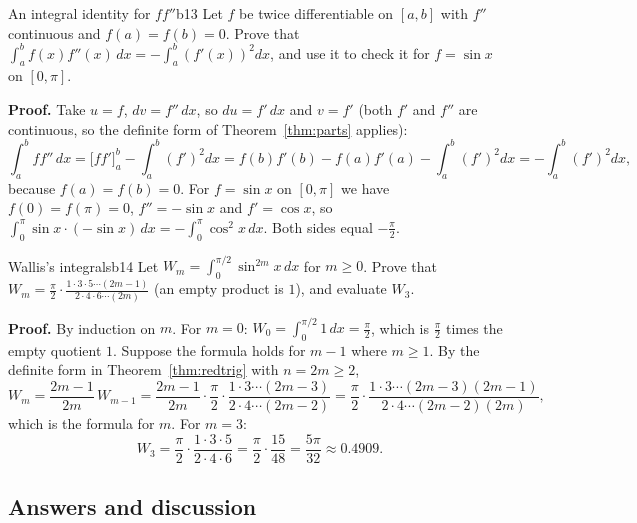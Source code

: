 \documentclass[11pt]{article}
\begin{document}
\begin{exmp}{An integral identity for $f f''$}{b13}
Let $f$ be twice differentiable on $[a,b]$ with $f''$ continuous and $f(a)=f(b)=0$. Prove that $\int_a^bf(x)f''(x)\,dx=-\int_a^b\left(f'(x)\right)^2dx$, and use it to check it for $f=\sin x$ on $[0,\pi]$.

\textbf{Proof.} Take $u=f$, $dv=f''\,dx$, so $du=f'\,dx$ and $v=f'$ (both $f'$ and $f''$ are continuous, so the definite form of Theorem~\ref{thm:parts} applies):
\[\int_a^bff''\,dx=\Big[ff'\Big]_a^b-\int_a^b\left(f'\right)^2dx=f(b)f'(b)-f(a)f'(a)-\int_a^b\left(f'\right)^2dx=-\int_a^b\left(f'\right)^2dx,\]
because $f(a)=f(b)=0$. For $f=\sin x$ on $[0,\pi]$ we have $f(0)=f(\pi)=0$, $f''=-\sin x$ and $f'=\cos x$, so $\int_0^\pi\sin x\cdot(-\sin x)\,dx=-\int_0^\pi\cos^2x\,dx$. Both sides equal $-\frac\pi2$.
\end{exmp}

\begin{exmp}{Wallis's integrals}{b14}
Let $W_m=\int_0^{\pi/2}\sin^{2m}x\,dx$ for $m\ge0$. Prove that $W_m=\frac\pi2\cdot\frac{1\cdot3\cdot5\cdots(2m-1)}{2\cdot4\cdot6\cdots(2m)}$ (an empty product is $1$), and evaluate $W_3$.

\textbf{Proof.} By induction on $m$. For $m=0$: $W_0=\int_0^{\pi/2}1\,dx=\frac\pi2$, which is $\frac\pi2$ times the empty quotient $1$. Suppose the formula holds for $m-1$ where $m\ge1$. By the definite form in Theorem~\ref{thm:redtrig} with $n=2m\ge2$,
\[W_m=\frac{2m-1}{2m}\,W_{m-1}=\frac{2m-1}{2m}\cdot\frac\pi2\cdot\frac{1\cdot3\cdots(2m-3)}{2\cdot4\cdots(2m-2)}=\frac\pi2\cdot\frac{1\cdot3\cdots(2m-3)(2m-1)}{2\cdot4\cdots(2m-2)(2m)},\]
which is the formula for $m$. For $m=3$:
\[W_3=\frac\pi2\cdot\frac{1\cdot3\cdot5}{2\cdot4\cdot6}=\frac\pi2\cdot\frac{15}{48}=\frac{5\pi}{32}\approx0.4909 .\]
\end{exmp}

\subsection*{Answers and discussion}
\end{document}
